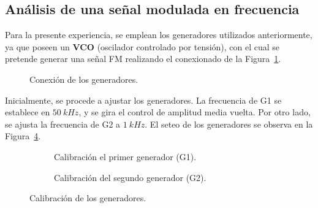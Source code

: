   \subsection{Análisis de una señal modulada en frecuencia}

    Para la presente experiencia, se emplean los generadores utilizados anteriormente, 
    ya que poseen un \textbf{VCO} (oscilador controlado por tensión), con el 
    cual se pretende generar una señal FM realizando el conexionado de la 
    Figura~\ref{fig:Exp6EsquemaGeneradores}. 

      \begin{figure}[H]
        \centering
          \caption{Conexión de los generadores.}
          \label{fig:Exp6EsquemaGeneradores}
      \end{figure}

    Inicialmente, se procede a ajustar los generadores. La frecuencia de G1 se establece en 
    $50~kHz$, y se gira el control de amplitud media vuelta. Por otro lado, se ajusta la 
    frecuencia de G2 a $1~kHz$. El seteo de los generadores se observa en la 
    Figura~\ref{fig:Exp6CalibracionGeneradores}.

      \begin{figure}[H]
        \centering
        \begin{subfigure}[H]{0.48\textwidth}
          \caption{Calibración el primer generador (G1).}
          \label{fig:Exp6CalibracionG1}
        \end{subfigure}
        \hfill 
        \begin{subfigure}[H]{0.48\textwidth}
          \caption{Calibración del segundo generador (G2).}
          \label{fig:Exp6CalibracionG2}
        \end{subfigure}
        \caption{Calibración de los generadores.}
        \label{fig:Exp6CalibracionGeneradores}
      \end{figure}

